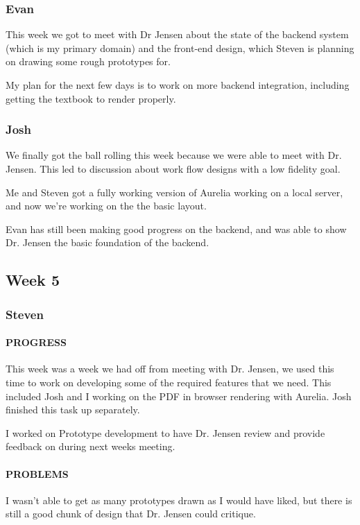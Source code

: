 \documentclass[onecolumn, draftclsnofoot,10pt, compsoc]{IEEEtran}
\begin{document}
	\subsubsection{Evan}
	This week we got to meet with Dr Jensen about the state of the backend system (which is my primary domain) and the front-end design, which Steven is planning on drawing some rough prototypes for.
	
	My plan for the next few days is to work on more backend integration, including getting the textbook to render properly.
	
	\subsubsection{Josh}
	We finally got the ball rolling this week because we were able to meet with Dr. Jensen. This led to discussion about work flow designs with a low fidelity goal. 
	
	Me and Steven got a fully working version of Aurelia working on a local server, and now we're working on the the basic layout. 
	
	Evan has still been making good progress on the backend, and was able to show Dr. Jensen the basic foundation of the backend. 
\subsection{Week 5}
	\subsubsection{Steven}
	
	\paragraph{PROGRESS}
	This week was a week we had off from meeting with Dr. Jensen, we used this time to work on developing some of the required features that we need. This included Josh and I working on the PDF in browser rendering with Aurelia. Josh finished this task up separately.
	
	I worked on Prototype development to have Dr. Jensen review and provide feedback on during next weeks meeting. 
	
	\paragraph{PROBLEMS}
	I wasn't able to get as many prototypes drawn as I would have liked, but there is still a good chunk of design that Dr. Jensen could critique.
	
\end{document}
